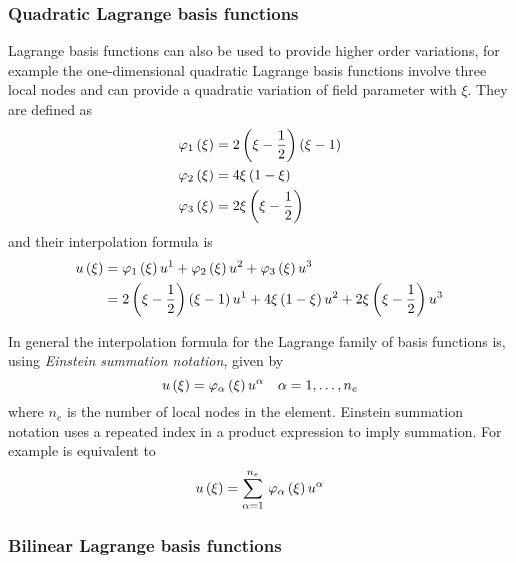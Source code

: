 \subsubsection{Quadratic Lagrange basis functions}

Lagrange basis functions can also be used to provide higher order variations,
for example the one-dimensional quadratic Lagrange basis functions involve
three local nodes and can provide a quadratic variation of field parameter
with $\xi$. They are defined as
\begin{equation}
  \begin{split}
       \varphi_{1} \left( \xi \right)  &=2\left( \xi-\frac12 \right)\left( \xi-1 \right) \\
       \varphi_{2} \left( \xi \right)  &=4\xi\left( 1-\xi \right) \\
       \varphi_{3} \left( \xi \right)  &=2\xi\left( \xi-\frac12 \right)
  \end{split}
  \label{eqn:quadraticlbfuns}
\end{equation}
and their interpolation formula is
\begin{equation}
  \begin{split}
     u\left( \xi \right) &=   \varphi_{1} \left( \xi \right)   {u}^{1} +   \varphi_{2} \left( \xi \right)   {u}^{2} +
       \varphi_{3} \left( \xi \right)   {u}^{3} \\
    &=2\left( \xi-\frac12 \right)\left( \xi-1 \right) {u}^{1} +
    4\xi\left( 1-\xi \right) {u}^{2} +2\xi\left( \xi-\frac12 \right) {u}^{3} 
  \end{split}
\end{equation}

In general the interpolation formula for the Lagrange family of basis
functions is, using \emph{Einstein
  summation notation}, given by
\begin{equation}
   u\left( \xi \right) =   \varphi_{\alpha} \left( \xi \right)   {u}^{\alpha} \quad \alpha=1,\ldots,n_{e}
  \label{eqn:lagrangeinterpolation}
\end{equation}
where $n_{e}$ is the number of local nodes in the element. Einstein summation
notation uses a repeated index in a product expression to imply summation. For
example  is equivalent to
\begin{equation}
   u\left( \xi \right) =  \displaystyle\sum_{\alpha=1}^{n_{e}} \,   \varphi_{\alpha} \left( \xi \right)   {u}^{\alpha}  
\end{equation}

\subsubsection{Bilinear Lagrange basis functions}

